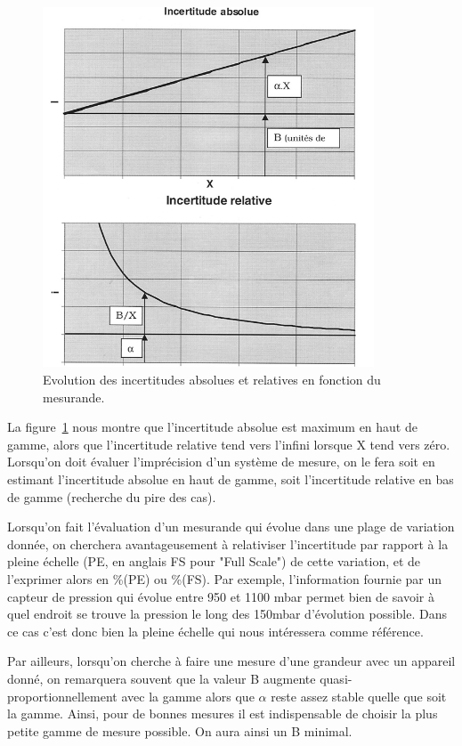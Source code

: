 \begin{figure}[h]
\centering
\includegraphics[height=10.7cm]{assets/figures/3_2_incertitudes_absolues_et_relatives.PNG}
\caption{Evolution des incertitudes absolues et relatives en fonction du mesurande.}
\label{fig:incertitudes_absolues_et_relatives}
\end{figure}

La figure~\ref{fig:incertitudes_absolues_et_relatives} nous montre que l'incertitude absolue est maximum en haut de gamme, alors que l'incertitude relative tend vers l'infini lorsque X tend vers zéro. Lorsqu'on doit évaluer l'imprécision d'un système de mesure, on le fera soit en estimant l'incertitude absolue en haut de gamme, soit l'incertitude relative en bas de gamme (recherche du pire des cas).

Lorsqu'on fait l'évaluation d'un mesurande qui évolue dans une plage de variation donnée, on cherchera avantageusement à relativiser l'incertitude par rapport à la pleine échelle (PE, en anglais FS pour "Full Scale") de cette variation, et de l'exprimer alors en \%(PE) ou \%(FS). Par exemple, l'information fournie par un capteur de pression qui évolue entre 950 et 1100 mbar permet bien de savoir à quel endroit se trouve la pression le long des 150mbar d'évolution possible. Dans ce cas c'est donc bien la pleine échelle qui nous intéressera comme référence.

Par ailleurs, lorsqu'on cherche à faire une mesure d'une grandeur avec un appareil donné, on remarquera souvent que la valeur B augmente quasi-proportionnellement avec la gamme alors que $\alpha$ reste assez stable quelle que soit la gamme. Ainsi, pour de bonnes mesures il est indispensable de choisir la plus petite gamme de mesure possible. On aura ainsi un B minimal.

